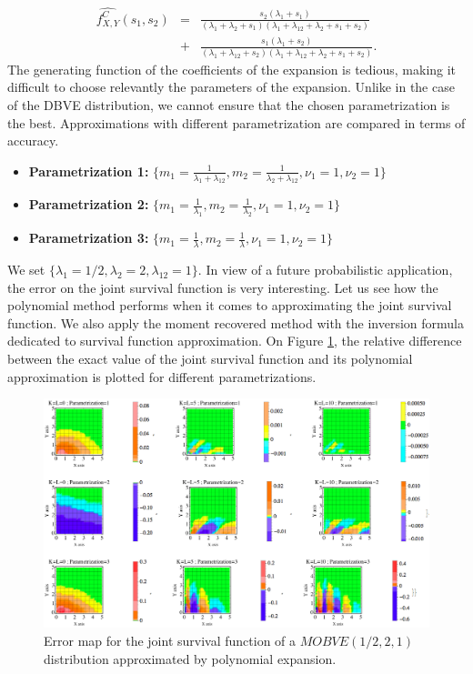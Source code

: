 \begin{eqnarray}
\widehat{f_{X,Y}^{C}}(s_{1},s_{2})&=&\frac{s_{2} (\lambda_{1}+s_{1})}{(\lambda_{1}+\lambda_{2}+s_{1}) (\lambda_{1}+\lambda_{12}+\lambda_{2}+s_{1}+s_{2})}\\
&+&\frac{s_{1} (\lambda_{1}+s_{2})}{(\lambda_{1}+\lambda_{12}+s_{2}) (\lambda_{1}+\lambda_{12}+\lambda_{2}+s_{1}+s_{2})}.
\end{eqnarray}  
The generating function of the coefficients of the expansion is tedious, making it difficult to choose relevantly the parameters of the expansion. Unlike in the case of the DBVE distribution, we cannot ensure that the chosen parametrization is the best. Approximations with different parametrization are compared in terms of accuracy.
\begin{itemize}
\item \textbf{Parametrization 1:} $\{m_{1}=\frac{1}{\lambda_{1}+\lambda_{12}}, m_{2}=\frac{1}{\lambda_{2}+\lambda_{12}}, \nu_{1}=1, \nu_{2}=1\}$
\item \textbf{Parametrization 2:} $\{m_{1}=\frac{1}{\lambda_{1}}, m_{2}=\frac{1}{\lambda_{2}}, \nu_{1}=1, \nu_{2}=1\}$
\item \textbf{Parametrization 3:} $\{m_{1}=\frac{1}{\lambda}, m_{2}=\frac{1}{\lambda}, \nu_{1}=1, \nu_{2}=1\}$
\end{itemize}
We set $\{\lambda_{1}=1/2,\lambda_{2}=2,\lambda_{12}=1\}$.  In view of a future probabilistic application, the error on the joint survival function is very interesting. Let us see how the polynomial method performs when it comes to approximating the joint survival function. We also apply the moment recovered method with the inversion formula dedicated to survival function approximation. On Figure \ref{MOBVESurvivalApproxContinuousPart}, the relative difference between the exact value of the joint survival function and its polynomial approximation is plotted for different parametrizations. 
\begin{center}
	\begin{figure}[h!]
		\begin{center}
			\includegraphics[width=16cm]{Chapitre5/GraphMOBVESurvivalPolynomial.png}
			\caption{Error map for the joint survival function of a $MOBVE(1/2,2,1)$ distribution approximated by polynomial expansion.}\label{MOBVESurvivalApproxContinuousPart}
		\end{center}
	\end{figure}
\end{center}
